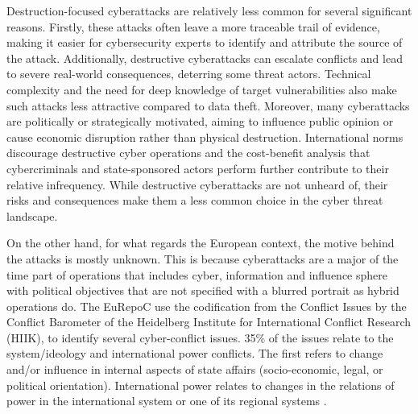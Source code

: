 Destruction-focused cyberattacks are relatively less common for several significant reasons. Firstly, these attacks often leave a more traceable trail of evidence, making it easier for cybersecurity experts to identify and attribute the source of the attack. Additionally, destructive cyberattacks can escalate conflicts and lead to severe real-world consequences, deterring some threat actors. Technical complexity and the need for deep knowledge of target vulnerabilities also make such attacks less attractive compared to data theft. Moreover, many cyberattacks are politically or strategically motivated, aiming to influence public opinion or cause economic disruption rather than physical destruction. International norms discourage destructive cyber operations and the cost-benefit analysis that cybercriminals and state-sponsored actors perform further contribute to their relative infrequency. While destructive cyberattacks are not unheard of, their risks and consequences make them a less common choice in the cyber threat landscape. 

On the other hand, for what regards the European context, the motive behind the attacks is mostly unknown. This is because cyberattacks are a major of the time part of operations that includes cyber, information and influence sphere with political objectives that are not specified with a blurred portrait as hybrid operations do. The EuRepoC use the codification from the Conflict Issues by the Conflict Barometer of the Heidelberg Institute for International Conflict Research (HIIK), to identify several cyber-conflict issues. 35\% of the issues relate to the system/ideology and international power conflicts. The first refers to change and/or influence in internal aspects of state affairs (socio-economic, legal, or political orientation). International power relates to changes in the relations of power in the international system or one of its regional systems \parencite{hiik_methodology}.

